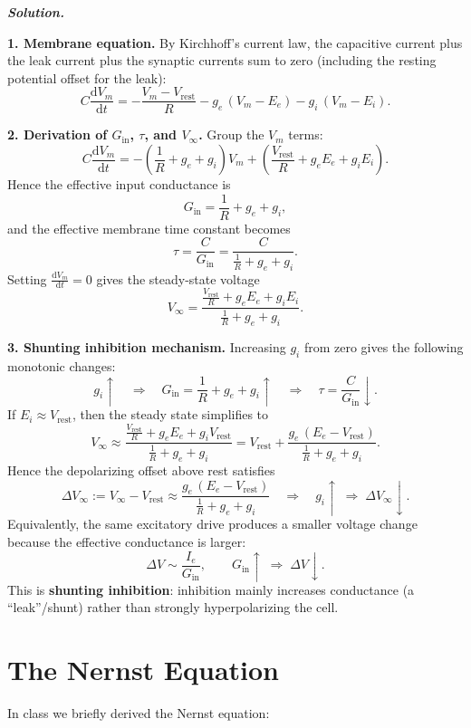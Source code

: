 \documentclass{article}
\newif\ifsolutionclearpage
\newenvironment{solution}{%
    \ifsolutionclearpage\clearpage\fi
    \global\solutionclearpagetrue
    \par\noindent\begin{solutionbox}\textbf{\textit{Solution.}}\par\medskip\itshape
}{%
    \end{solutionbox}
}
\begin{document}
\begin{solution}
\textbf{1. Membrane equation.}
By Kirchhoff's current law, the capacitive current plus the leak current plus the synaptic currents sum to zero (including the resting potential offset for the leak):
\[
C\frac{\mathrm{d}V_m}{\mathrm{d}t}=-\frac{V_m-V_{\text{rest}}}{R}-g_e\,(V_m-E_e)-g_i\,(V_m-E_i).
\]

\textbf{2. Derivation of $G_{\text{in}}$, $\tau$, and $V_{\infty}$.}
Group the $V_m$ terms:
\[
C\frac{\mathrm{d}V_m}{\mathrm{d}t}=-\left(\frac{1}{R}+g_e+g_i\right)V_m+\left(\frac{V_{\text{rest}}}{R}+g_eE_e+g_iE_i\right).
\]
Hence the effective input conductance is
\[
G_{\text{in}}=\frac{1}{R}+g_e+g_i,
\]
and the effective membrane time constant becomes
\[
\tau=\frac{C}{G_{\text{in}}}=\frac{C}{\frac{1}{R}+g_e+g_i}.
\]
Setting $\frac{\mathrm{d}V_m}{\mathrm{d}t}=0$ gives the steady-state voltage
\[
V_{\infty}=\frac{\frac{V_{\text{rest}}}{R}+g_eE_e+g_iE_i}{\frac{1}{R}+g_e+g_i}.
\]

\textbf{3. Shunting inhibition mechanism.}
Increasing $g_i$ from zero gives the following monotonic changes:
\[
g_i\uparrow\quad\Longrightarrow\quad
G_{\text{in}}=\frac{1}{R}+g_e+g_i\uparrow
\quad\Longrightarrow\quad
\tau=\frac{C}{G_{\text{in}}}\downarrow.
\]
If $E_i\approx V_{\text{rest}}$, then the steady state simplifies to
\[
V_{\infty}\approx
\frac{\frac{V_{\text{rest}}}{R}+g_eE_e+g_iV_{\text{rest}}}{\frac{1}{R}+g_e+g_i}
=
V_{\text{rest}}+\frac{g_e\,(E_e-V_{\text{rest}})}{\frac{1}{R}+g_e+g_i}.
\]
Hence the depolarizing offset above rest satisfies
\[
\Delta V_{\infty}:=V_{\infty}-V_{\text{rest}}
\approx \frac{g_e\,(E_e-V_{\text{rest}})}{\frac{1}{R}+g_e+g_i}
\quad\Longrightarrow\quad
g_i\uparrow\;\Rightarrow\;\Delta V_{\infty}\downarrow.
\]
Equivalently, the same excitatory drive produces a smaller voltage change because the effective conductance is larger:
\[
\Delta V\sim \frac{I_e}{G_{\text{in}}},
\qquad
G_{\text{in}}\uparrow\;\Rightarrow\;\Delta V\downarrow.
\]
This is \textbf{shunting inhibition}: inhibition mainly increases conductance (a ``leak''/shunt) rather than strongly hyperpolarizing the cell.
\end{solution}

\clearpage

\section{The Nernst Equation}

In class we briefly derived the Nernst equation:
\end{document}
